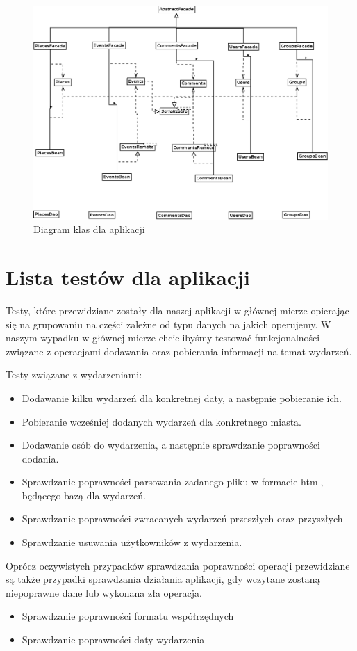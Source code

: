 \documentclass[a4paper]{article}
\begin{document}
\begin{figure}[!h]
\begin{center}
  \includegraphics[width=\textwidth]{classDiagram.png}
  \caption{Diagram klas dla aplikacji}
  \label{klasy}
\end{center}
\end{figure}

\pagebreak
\section{Lista testów dla aplikacji}
Testy, które przewidziane zostały dla naszej aplikacji w głównej mierze opierając się na grupowaniu na 
części zależne od typu danych na jakich operujemy.
W naszym wypadku w głównej mierze chcielibyśmy testować funkcjonalności związane z operacjami dodawania oraz pobierania informacji 
na temat wydarzeń.

Testy związane z wydarzeniami:
\begin{itemize}
 \item Dodawanie kilku wydarzeń dla konkretnej daty, a następnie pobieranie ich.
 \item Pobieranie wcześniej dodanych wydarzeń dla konkretnego miasta.
 \item Dodawanie osób do wydarzenia, a następnie sprawdzanie poprawności dodania.
 \item Sprawdzanie poprawności parsowania zadanego pliku w formacie html, będącego bazą dla wydarzeń.
 \item Sprawdzanie poprawności zwracanych wydarzeń przeszłych oraz przyszłych
 \item Sprawdzanie usuwania użytkowników z wydarzenia.
\end{itemize}


Oprócz oczywistych przypadków sprawdzania poprawności operacji przewidziane są także
przypadki sprawdzania działania aplikacji, gdy wczytane zostaną niepoprawne dane lub wykonana zła operacja.
\begin{itemize}
 \item Sprawdzanie poprawności formatu współrzędnych
 \item Sprawdzanie poprawności daty wydarzenia
\end{itemize}

 
\end{document}
